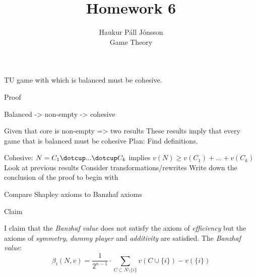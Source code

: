 \documentclass[12pt]{article}
\newenvironment{question}[2][Question]{\begin{trivlist}
\item[\hskip \labelsep {\bfseries #1}\hskip \labelsep {\bfseries #2.}]}{\end{trivlist}}
\newenvironment{answer}[2][Answer]{\begin{trivlist}
\item[\hskip \labelsep {\bfseries #1}\hskip \labelsep {\bfseries #2:}]}{\end{trivlist}}
\begin{document}
\let\oldsum\sum
\renewcommand{\sum}[3]{\oldsum\limits_{#1}^{#2}#3}
\let\oldprod\prod
\renewcommand{\prod}[3]{\oldprod\limits_{#1}^{#2}#3}

\title{Homework 6}
\author{Haukur Páll Jónsson\\
Game Theory}

\maketitle

\begin{question}{1}
TU game with which is balanced must be cohesive.
\end{question}
\begin{answer}{a)}{Proof}

Balanced -> non-empty -> cohesive

Given that core is non-empty => two results
These results imply that every game that is balanced must be cohesive
Plan: Find definitions.

Cohesive: $N = C_1 \dotcup ... \dotcup C_k$ implies $v(N) \geq v(C_1) + ... + v(C_k)$
Look at previous results
Consider transformations/rewrites
Write down the conclusion of the proof to begin with
\end{answer}

\begin{question}{2}
Compare Shapley axioms to Banzhaf axioms
\end{question}
\begin{answer}{a-d)}{Claim}

I claim that the \textit{Banzhaf value} does not satisfy the axiom of \textit{efficiency} but the axioms of \textit{symmetry}, \textit{dummy player} and \textit{additivity} are satisfied. The \textit{Banzhaf value}:
$$\beta_i(N,v)=\frac{1}{2^{n-1}}\cdot \sum{C \subset N \setminus \{i\}}{}{v(C \cup \{i\}) - v(\{i\})}$$
\end{answer}
\end{document}
